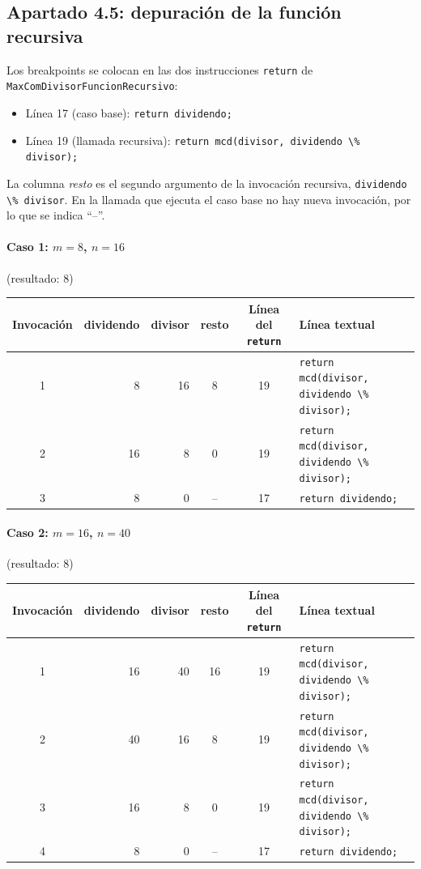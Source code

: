 \documentclass[11pt,a4paper]{article}
\newcommand{\cod}[1]{\lstinline[basicstyle=\ttfamily\footnotesize]|#1|}
\begin{document}
\subsection{Apartado 4.5: depuración de la función recursiva}
Los breakpoints se colocan en las dos instrucciones \texttt{return} de \texttt{MaxComDivisorFuncionRecursivo}:
\begin{itemize}
  \item Línea 17 (caso base): \cod{return dividendo;}
  \item Línea 19 (llamada recursiva): \cod{return mcd(divisor, dividendo \% divisor);}
\end{itemize}
La columna \emph{resto} es el segundo argumento de la invocación recursiva, \cod{dividendo \% divisor}. En la llamada que ejecuta el caso base no hay nueva invocación, por lo que se indica ``--''.

\paragraph{Caso 1: $m=8$, $n=16$} (resultado: 8)
\begin{center}
\footnotesize
\begin{tabular}{c r r c c p{5.2cm}}
\toprule
Invocación & dividendo & divisor & resto & Línea del \texttt{return} & Línea textual \\
\midrule
1 & 8  & 16 & 8  & 19 & \cod{return mcd(divisor, dividendo \% divisor);} \\
2 & 16 & 8  & 0  & 19 & \cod{return mcd(divisor, dividendo \% divisor);} \\
3 & 8  & 0  & -- & 17 & \cod{return dividendo;} \\
\bottomrule
\end{tabular}
\end{center}

\paragraph{Caso 2: $m=16$, $n=40$} (resultado: 8)
\begin{center}
\footnotesize
\begin{tabular}{c r r c c p{5.2cm}}
\toprule
Invocación & dividendo & divisor & resto & Línea del \texttt{return} & Línea textual \\
\midrule
1 & 16 & 40 & 16 & 19 & \cod{return mcd(divisor, dividendo \% divisor);} \\
2 & 40 & 16 & 8  & 19 & \cod{return mcd(divisor, dividendo \% divisor);} \\
3 & 16 & 8  & 0  & 19 & \cod{return mcd(divisor, dividendo \% divisor);} \\
4 & 8  & 0  & -- & 17 & \cod{return dividendo;} \\
\bottomrule
\end{tabular}
\end{center}
\end{document}
